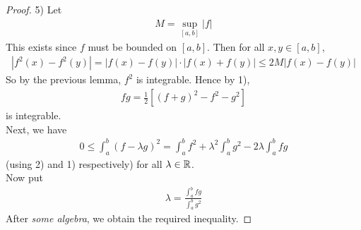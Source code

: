 \documentclass[a4paper]{article}
\begin{document}
\begin{thm}
\begin{proof}
5) Let
\begin{equation*}
\begin{aligned}
M=\sup_{\left[a,b\right]} |f|
\end{aligned}
\end{equation*}
This exists since $f$ must be bounded on $\left[a,b\right]$. Then for all $x,y\in\left[a,b\right]$,
\begin{equation*}
\begin{aligned}
|f^2\left(x\right) - f^2\left(y\right)| = |f\left(x\right) - f\left(y\right)| \cdot |f\left(x\right) + f\left(y\right)| \leq 2M |f\left(x\right) - f\left(y\right)|
\end{aligned}
\end{equation*}
So by the previous lemma, $f^2$ is integrable. Hence by 1),
\begin{equation*}
\begin{aligned}
fg = \frac{1}{2}\left[\left(f+g\right)^2 - f^2 - g^2\right]
\end{aligned}
\end{equation*}
is integrable.\\
Next, we have
\begin{equation*}
\begin{aligned}
0\leq \int_a^b \left(f-\lambda g\right)^2 = \int_a^b f^2 + \lambda ^2 \int_a^b g^2 - 2\lambda \int_a^b fg
\end{aligned}
\end{equation*}
(using 2) and 1) respectively) for all $\lambda\in\mathbb{R}$.\\
Now put
\begin{equation*}
\begin{aligned}
\lambda = \frac{\int_a^b fg}{\int_a^b g^2}
\end{aligned}
\end{equation*}
After \emph{some algebra}, we obtain the required inequality.
\end{proof}
\end{thm}
\end{document}
